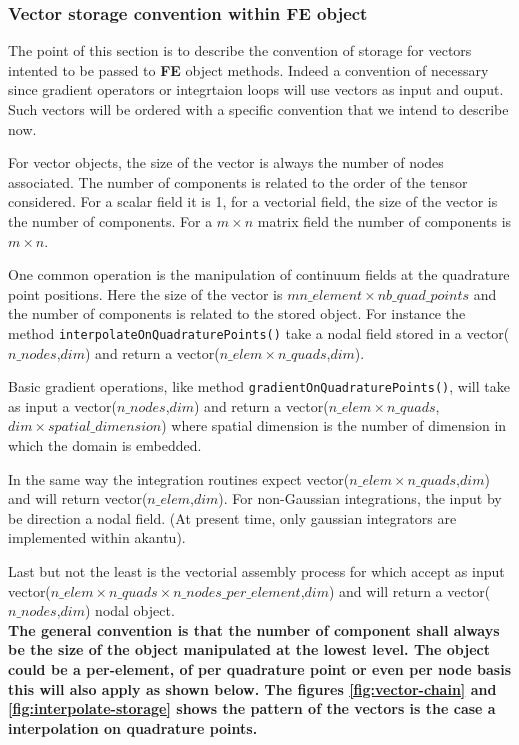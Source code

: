 \documentclass[a4paper,11pt]{book}
\begin{document}
\subsubsection{Vector storage convention within FE object\label{sec:FE-convention}}

The point of  this section is to describe the convention  of storage for vectors
intented  to be  passed to  {\bf  FE} object  methods.  Indeed  a convention  of
necessary  since gradient  operators or  integrtaion loops  will use  vectors as
input and ouput.   Such vectors will be ordered with  a specific convention that
we intend to describe now.

For  vector objects,  the  size of  the vector  is  always the  number of  nodes
associated.  The number  of components  is related  to the  order of  the tensor
considered. For a scalar  field it is 1, for a vectorial  field, the size of the
vector is the number of components. For a $m\times n$ matrix field the number of
components is $m\times n$.

One common operation  is the manipulation of continuum  fields at the quadrature
point  positions.   Here  the  size   of  the  vector  is   $mn\_element  \times
nb\_quad\_points$  and  the  number  of  components is  related  to  the  stored
object.  For instance the  method \verb$interpolateOnQuadraturePoints()$  take a
nodal field  stored in a  vector($n\_nodes$,$dim$) and return  a vector($n\_elem
\times n\_quads$,$dim$).

Basic gradient operations, like method \verb$gradientOnQuadraturePoints()$, will
take  as input a  vector($n\_nodes$,$dim$) and  return a  vector($n\_elem \times
n\_quads$,$dim \times spatial\_dimension$) where spatial dimension is the number
of dimension in which the domain is embedded.

In  the  same  way   the  integration  routines  expect  vector($n\_elem  \times
n\_quads$,$dim$)  and  will  return vector($n\_elem$,$dim$).   For  non-Gaussian
integrations, the input  by be direction a nodal field.   (At present time, only
gaussian integrators are implemented within akantu).

Last but  not the least  is the vectorial  assembly process for which  accept as
input vector($n\_elem \times n\_quads \times n\_nodes\_per\_element$,$dim$)
and will return a vector($n\_nodes$,$dim$) nodal object.\\

{\bf The general convention is that  the number of component shall always be the
  size of  the object manipulated  at the lowest  level.  The object could  be a
  per-element, of  per quadrature point  or even per  node basis this  will also
  apply    as   shown    below.   The    figures    \ref{fig:vector-chain}   and
  \ref{fig:interpolate-storage} shows the  pattern of the vectors is  the case a
  interpolation on quadrature points.}
\end{document}
